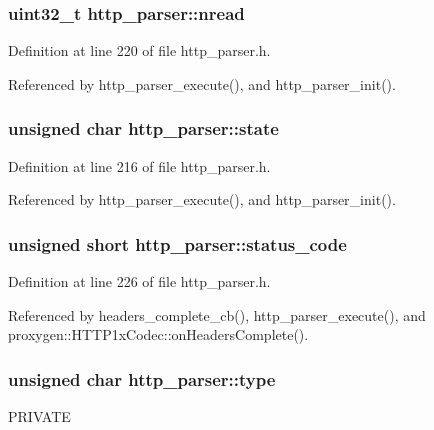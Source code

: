 \subsubsection[{nread}]{\setlength{\rightskip}{0pt plus 5cm}uint32\+\_\+t http\+\_\+parser\+::nread}\label{structhttp__parser_a78085ca896bb3b9aa1ecb0f6fddc039d}


Definition at line 220 of file http\+\_\+parser.\+h.



Referenced by http\+\_\+parser\+\_\+execute(), and http\+\_\+parser\+\_\+init().

\subsubsection[{state}]{\setlength{\rightskip}{0pt plus 5cm}unsigned char http\+\_\+parser\+::state}\label{structhttp__parser_a1e39f73146ee7cb9774482180c693d6b}


Definition at line 216 of file http\+\_\+parser.\+h.



Referenced by http\+\_\+parser\+\_\+execute(), and http\+\_\+parser\+\_\+init().

\subsubsection[{status\+\_\+code}]{\setlength{\rightskip}{0pt plus 5cm}unsigned short http\+\_\+parser\+::status\+\_\+code}\label{structhttp__parser_a6aaeac3a79271169cd0902992820a9c5}


Definition at line 226 of file http\+\_\+parser.\+h.



Referenced by headers\+\_\+complete\+\_\+cb(), http\+\_\+parser\+\_\+execute(), and proxygen\+::\+H\+T\+T\+P1x\+Codec\+::on\+Headers\+Complete().

\subsubsection[{type}]{\setlength{\rightskip}{0pt plus 5cm}unsigned char http\+\_\+parser\+::type}\label{structhttp__parser_a20b4326f0a092ca2261b32ce22f0d296}
P\+R\+I\+V\+A\+TE 

